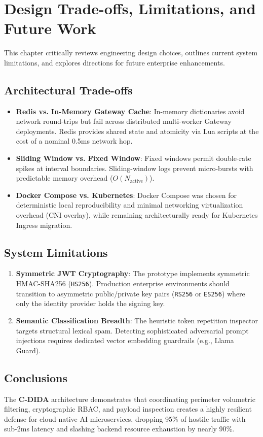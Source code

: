 \chapter{Design Trade-offs, Limitations, and Future Work}
\label{chap:tradeoffs}

This chapter critically reviews engineering design choices, outlines current system limitations, and explores directions for future enterprise enhancements.

\section{Architectural Trade-offs}
\begin{itemize}
    \item \textbf{Redis vs. In-Memory Gateway Cache}: In-memory dictionaries avoid network round-trips but fail across distributed multi-worker Gateway deployments. Redis provides shared state and atomicity via Lua scripts at the cost of a nominal 0.5ms network hop.
    \item \textbf{Sliding Window vs. Fixed Window}: Fixed windows permit double-rate spikes at interval boundaries. Sliding-window logs prevent micro-bursts with predictable memory overhead ($O(N_{\text{active}})$).
    \item \textbf{Docker Compose vs. Kubernetes}: Docker Compose was chosen for deterministic local reproducibility and minimal networking virtualization overhead (CNI overlay), while remaining architecturally ready for Kubernetes Ingress migration.
\end{itemize}

\section{System Limitations}
\begin{enumerate}
    \item \textbf{Symmetric JWT Cryptography}: The prototype implements symmetric HMAC-SHA256 (\texttt{HS256}). Production enterprise environments should transition to asymmetric public/private key pairs (\texttt{RS256} or \texttt{ES256}) where only the identity provider holds the signing key.
    \item \textbf{Semantic Classification Breadth}: The heuristic token repetition inspector targets structural lexical spam. Detecting sophisticated adversarial prompt injections requires dedicated vector embedding guardrails (e.g., Llama Guard).
\end{enumerate}

\section{Conclusions}
The \textbf{C-DIDA} architecture demonstrates that coordinating perimeter volumetric filtering, cryptographic RBAC, and payload inspection creates a highly resilient defense for cloud-native AI microservices, dropping 95\% of hostile traffic with sub-2ms latency and slashing backend resource exhaustion by nearly 90\%.
